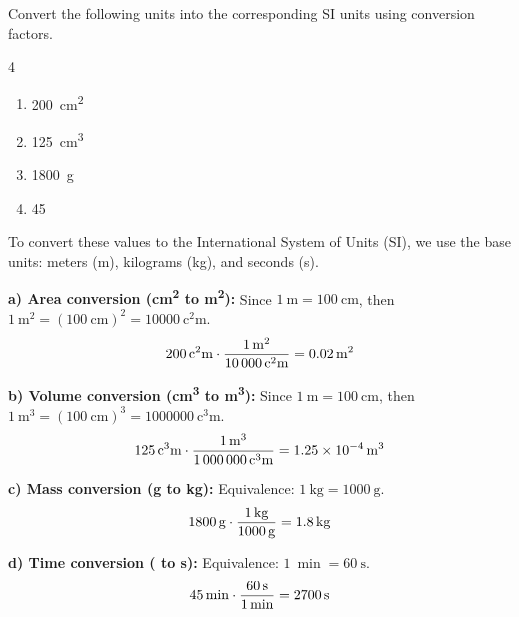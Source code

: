 \begin{exercise}
    Convert the following units into the corresponding SI units using conversion factors.
    \begin{multicols}{4}
        \begin{enumerate}[label=\letraminuscula]
            \item \qty{200}{\square\centi\metre}
            \item \qty{125}{\cubic\centi\metre}
            \item \qty{1800}{\g}
            \item \qty{45}{\min}
        \end{enumerate}
    \end{multicols}


    \begin{solu}
        To convert these values to the International System of Units (SI), we use the base units: meters (\unit{\m}), kilograms (\unit{\kg}), and seconds (\unit{\s}).

        \textbf{a) Area conversion (\unit{\square\centi\metre} to \unit{\square\metre}):}
        Since \( \qty{1}{\metre} = \qty{100}{\centi\metre} \), then \( \qty{1}{\square\metre} = (\qty{100}{\centi\metre})^2 = \qty{10000}{\square\centi\metre} \).
        \[ \qty{200}{\cancel{\square\centi\metre}} \cdot \frac{\qty{1}{\square\metre}}{\qty{10000}{\cancel{\square\centi\metre}}} = \qty{0.02}{\square\metre} \]

        \textbf{b) Volume conversion (\unit{\cubic\centi\metre} to \unit{\cubic\metre}):}
        Since \( \qty{1}{\metre} = \qty{100}{\centi\metre} \), then \( \qty{1}{\cubic\metre} = (\qty{100}{\centi\metre})^3 = \qty{1000000}{\cubic\centi\metre} \).
        \[ \qty{125}{\cancel{\cubic\centi\metre}} \cdot \frac{\qty{1}{\cubic\metre}}{\qty{1000000}{\cancel{\cubic\centi\metre}}} = \qty{1.25e-4}{\cubic\metre} \]

        \textbf{c) Mass conversion (\unit{\g} to \unit{\kg}):}
        Equivalence: \( \qty{1}{\kg} = \qty{1000}{\g} \).
        \[ \qty{1800}{\cancel{\g}} \cdot \frac{\qty{1}{\kg}}{\qty{1000}{\cancel{\g}}} = \qty{1.8}{\kg} \]

        \textbf{d) Time conversion (\unit{\min} to \unit{\s}):}
        Equivalence: \( \qty{1}{\min} = \qty{60}{\s} \).
        \[ \qty{45}{\cancel{\min}} \cdot \frac{\qty{60}{\s}}{\qty{1}{\cancel{\min}}} = \qty{2700}{\s} \]
    \end{solu}

\end{exercise}

